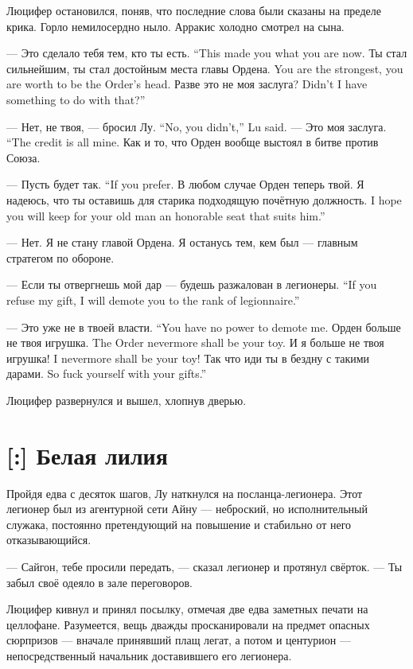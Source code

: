 Люцифер остановился, поняв, что последние слова были сказаны на пределе крика.
Горло немилосердно ныло.
Арракис холодно смотрел на сына.

{--- Это сделало тебя тем, кто ты есть.}
{``This made you what you are now.}
{Ты стал сильнейшим, ты стал достойным места главы Ордена.}
{You are the strongest, you are worth to be the Order's head.}
{Разве это не моя заслуга?}
{Didn't I have something to do with that?''}

{--- Нет, не твоя, --- бросил Лу.}
{``No, you didn't,'' Lu said.}
{--- Это моя заслуга.}
{``The credit is all mine.}
Как и то, что Орден вообще выстоял в битве против Союза.

{--- Пусть будет так.}
{``If you prefer.}
В любом случае Орден теперь твой.
{Я надеюсь, что ты оставишь для старика подходящую почётную должность.}
{I hope you will keep for your old man an honorable seat that suits him.''}

--- Нет.
Я не стану главой Ордена.
Я останусь тем, кем был --- главным стратегом по обороне.

{--- Если ты отвергнешь мой дар --- будешь разжалован в легионеры.}
{``If you refuse my gift, I will demote you to the rank of legionnaire.''}

{--- Это уже не в твоей власти.}
{``You have no power to demote me.}
{Орден больше не твоя игрушка.}
{The Order nevermore shall be your toy.}
{И я больше не твоя игрушка!}
{I nevermore shall be your toy!}
{Так что иди ты в бездну с такими дарами.}
{So fuck yourself with your gifts.''}

Люцифер развернулся и вышел, хлопнув дверью.

\section{[:] Белая лилия}

Пройдя едва с десяток шагов, Лу наткнулся на посланца-легионера.
Этот легионер был из агентурной сети Айну --- неброский, но исполнительный служака, постоянно претендующий на повышение и стабильно от него отказывающийся.

--- Сайгон, тебе просили передать, --- сказал легионер и протянул свёрток.
--- Ты забыл своё одеяло в зале переговоров.

Люцифер кивнул и принял посылку, отмечая две едва заметных печати на целлофане.
Разумеется, вещь дважды просканировали на предмет опасных сюрпризов --- вначале принявший плащ легат, а потом и центурион --- непосредственный начальник доставившего его легионера.

